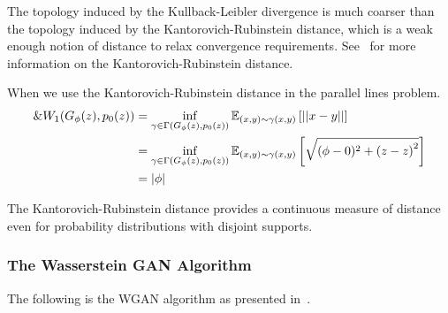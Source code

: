 The topology induced by the Kullback-Leibler divergence is much
coarser than the topology induced by the Kantorovich-Rubinstein
distance, which is a weak enough notion of distance to relax
convergence requirements. See~\cite{ref:villani-2008} for more
information on the Kantorovich-Rubinstein distance.

\begin{example}
  When we use the Kantorovich-Rubinstein distance in the parallel
  lines problem.
  \begin{align}
    \&W_1(G_\phi(z), p_0(z)) & = \inf_{\gamma \in
                           \Gamma(G_\phi(z),p_0(z))}\mathbb{E}_{(x,y) \sim
                           \gamma(x, y)} \left[ || x-y || \right] \\
                         & =\inf_{\gamma \in \Gamma(G_\phi(z),
                           p_0(z))}\mathbb{E}_{(x,y) \sim \gamma(x,
                           y)} \left[ \sqrt{(\phi - 0)^2 + {(z - z)}^2}
                           \right] \\
                         & =|\phi|
  \end{align}
\end{example}

The Kantorovich-Rubinstein distance provides a continuous measure of
distance even for probability distributions with disjoint supports.

\subsubsection*{The Wasserstein GAN Algorithm}

The following is the WGAN algorithm as presented in~\cite{ref:arjovsky-2017}.

